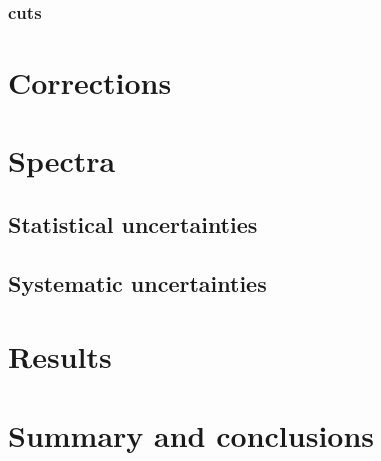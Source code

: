 \subsubsection{\vzero cuts}
\label{sec:hadron:signal:cuts}

\section{Corrections}


\section{Spectra}


\subsection{Statistical uncertainties}


\subsection{Systematic uncertainties}
\label{sec:hadron:spec:syst}



\section{Results}

\section{Summary and conclusions}

